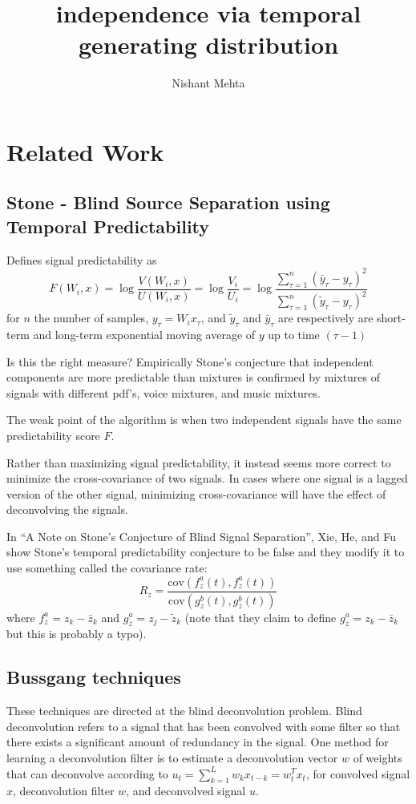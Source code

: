 \documentclass{article}
\title{independence via temporal generating distribution}
\author{Nishant Mehta}
\begin{document}
  \maketitle

  \section{Related Work}

  \subsection{Stone - Blind Source Separation using Temporal Predictability}

  Defines signal predictability as
  \[
  F(W_i, x) = \log \frac{V(W_i, x)}{U(W_i,x)} = \log \frac{V_i}{U_i}
  = \log \frac{\sum_{\tau = 1}^n (\bar{y}_{\tau} - y_{\tau})^2}{\sum_{\tau = 1}^n (\tilde{y}_{\tau} - y_{\tau})^2}
  \]
  for $n$ the number of samples, $y_{\tau} = W_i x_{\tau}$, and $\tilde{y}_{\tau}$ and $\bar{y}_{\tau}$ are respectively are short-term and long-term exponential moving average of $y$ up to time $(\tau - 1)$

  Is this the right measure? Empirically Stone's conjecture that independent components are more predictable than mixtures is confirmed by mixtures of signals with different pdf's, voice mixtures, and music mixtures.

  The weak point of the algorithm is when two independent signals have the same predictability score $F$.

  Rather than maximizing signal predictability, it instead seems more correct to minimize the cross-covariance of two signals. In cases where one signal is a lagged version of the other signal, minimizing cross-covariance will have the effect of deconvolving the signals.

  In ``A Note on Stone's Conjecture of Blind Signal Separation'', Xie, He, and Fu show Stone's temporal predictability conjecture to be false and they modify it to use something called the covariance rate:
\[
R_z = \frac{\text{cov}(f_z^a(t), f_z^a(t))}{\text{cov}(g_z^b(t), g_z^b(t))}
\]
where $f_z^a = z_k - \bar{z}_k$ and $g_z^a = z_j - \tilde{z}_k$ (note that they claim to define $g_z^a = z_k - \bar{z}_k$ but this is probably a typo).

  \subsection{Bussgang techniques}
  These techniques are directed at the blind deconvolution problem. Blind deconvolution refers to a signal that has been convolved with some filter so that there exists a significant amount of redundancy in the signal. One method for learning a deconvolution filter is to estimate a deconvolution vector $w$ of weights that can deconvolve according to $u_t = \sum_{k=1}^L w_k x_{t-k} = w_t^T x_t$, for convolved signal $x$, deconvolution filter $w$, and deconvolved signal $u$.
  
\end{document}
